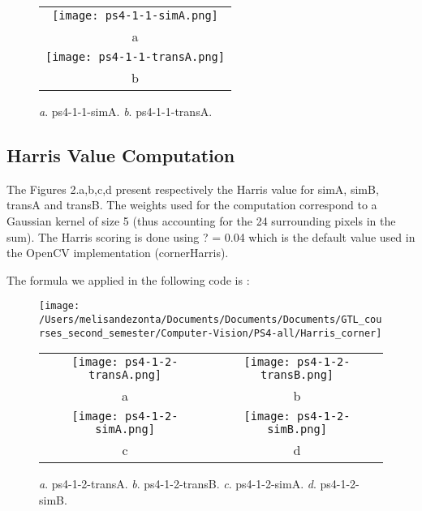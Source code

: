 \documentclass[a4paper,11pt]{article}
\begin{document}
 \begin{figure}[H]
\begin{center}
\begin{tabular}{c}
	\texttt{[image: ps4-1-1-simA.png]}\\
	a\\
	\texttt{[image: ps4-1-1-transA.png]}\\
	b
\end{tabular}
\end{center}
\caption{ 
\textit{a}. ps4-1-1-simA.  \textit{b}. ps4-1-1-transA. }
\label{ps-2-3}
\end{figure}

\lstset{style=mystyle}


\subsection{Harris Value Computation}


The Figures 2.a,b,c,d present respectively the Harris value for simA, simB, transA and transB.
The weights used for the computation correspond to a Gaussian kernel of size 5 (thus accounting for the 24 surrounding pixels in the sum). The Harris scoring is done using ? = 0.04 which is the default value used in the OpenCV implementation (cornerHarris).

The formula we applied in the following code is :
 \begin{figure}[H]
\begin{center}
	\texttt{[image: /Users/melisandezonta/Documents/Documents/Documents/GTL\_courses\_second\_semester/Computer-Vision/PS4-all/Harris\_corner]}
\end{center}
\end{figure}

 \begin{figure}[H]
\begin{center}
\begin{tabular}{cc}
	\texttt{[image: ps4-1-2-transA.png]}&
	\texttt{[image: ps4-1-2-transB.png]}\\
	a&b\\
	\texttt{[image: ps4-1-2-simA.png]}&
	\texttt{[image: ps4-1-2-simB.png]}\\
	c&d
\end{tabular}
\end{center}
\caption{ 
\textit{a}. ps4-1-2-transA.  \textit{b}. ps4-1-2-transB. \textit{c}. ps4-1-2-simA.  \textit{d}. ps4-1-2-simB.  }
\label{ps-4-1-2}
\end{figure}
\end{document}
